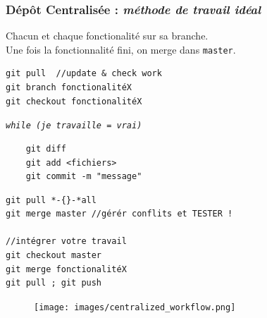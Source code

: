 \documentclass[table,tikz,12pt,svgnames]{beamer}
\begin{document}
\begin{frame}[fragile]
\frametitle{Dépôt Centralisée :\textit{ méthode de travail \textbf{idéal}}}
\begin{adjustwidth}{-1em}{0cm}{}
\vspace{-3.5em}
\color{darkgreen}%
Chacun et chaque fonctionalité sur sa branche. \\ Une fois la fonctionnalité fini, on merge dans \texttt{master}.\\
\color{black}
\vspace{-1.5em}
\begin{verbatim}
git pull  //update & check work
git branch fonctionalitéX
git checkout fonctionalitéX
\end{verbatim}

\vspace{-0.5em}
\textit{\texttt{while (je travaille = vrai) }} %
\vspace{-1em}
\begin{verbatim}
	git diff
	git add <fichiers>
	git commit -m "message"
\end{verbatim}
\vspace{-2.5em}
\begin{verbatim}
git pull *-{}-*all
git merge master //gérér conflits et TESTER !

//intégrer votre travail
git checkout master                  
git merge fonctionalitéX             
git pull ; git push                  
\end{verbatim}
\end{adjustwidth}




\vspace{-12em}

\begin{adjustwidth}{-0cm}{-1cm}{}
	\begin{figure}
		\hfill
		\texttt{[image: images/centralized\_workflow.png]}
	\end{figure}
\end{adjustwidth}


\end{frame}
\end{document}
